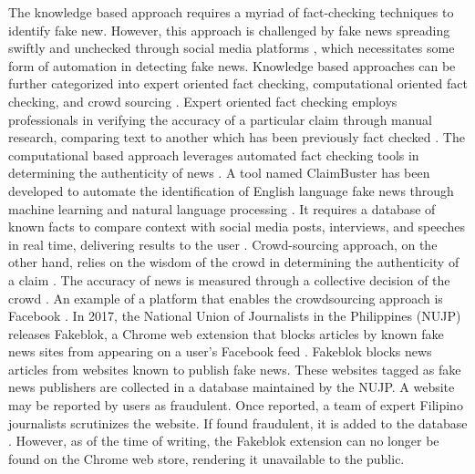 The knowledge based approach requires a myriad of fact-checking techniques to identify fake new. However, this approach is challenged by fake news spreading swiftly and unchecked through social media platforms \cite{qazvinian2011rumor}, which necessitates some form of automation in detecting fake news. Knowledge based approaches can be further categorized into expert oriented fact checking, computational oriented fact checking, and crowd sourcing \cite{debeer2020approaches}. Expert oriented fact checking employs professionals in verifying the accuracy of a particular claim through manual research, comparing text to another which has been previously fact checked \cite{vlachos2014factchecking}.  The computational based approach leverages automated fact checking tools in determining the authenticity of news \cite{ahmed2019combining}. A tool named ClaimBuster \cite{claimbuster, hassan2017proposal} has been developed to automate the identification of English language fake news through machine learning and natural language processing \cite{hassan2017toward}. It requires a database of known facts to compare context with social media posts, interviews, and speeches in real time, delivering results to the user \cite{hassan2017toward}. Crowd-sourcing approach, on the other hand, relies on the wisdom of the crowd in determining the authenticity of a claim \cite{ahmed2019combining}. The accuracy of news is measured through a collective decision of the crowd \cite{pennycook2019fighting}. An example of a platform that enables the crowdsourcing approach is Facebook \cite{tschiatschek2017detecting}. In 2017, the National Union of Journalists in the Philippines (NUJP) releases Fakeblok, a Chrome web extension that blocks articles by known fake news sites from appearing on a user's Facebook feed \cite{inquirer-fakeblok, rappler-fakeblok}. Fakeblok blocks news articles from websites known to publish fake news. These websites tagged as fake news publishers are collected in a database maintained by the NUJP. A website may be reported by users as fraudulent. Once reported, a team of expert Filipino journalists scrutinizes the website. If found fraudulent, it is added to the database \cite{cdi-fakeblok}. However, as of the time of writing, the Fakeblok extension can no longer be found on the Chrome web store, rendering it unavailable to the public.

